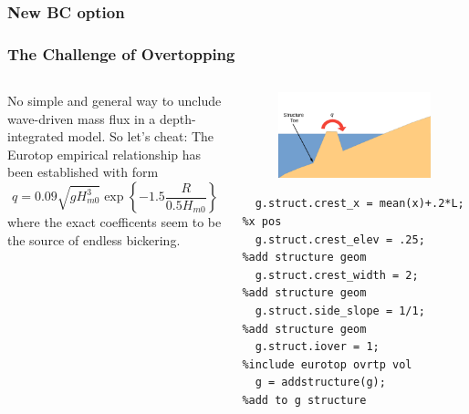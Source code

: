 \documentclass[aspectratio=169]{beamer}
\begin{document}
\begin{frame}
  \frametitle{New BC option}
\end{frame}
\begin{frame}[fragile]
  \frametitle{The Challenge of Overtopping}

 \begin{columns}[c] %
\begin{column}{0.5\textwidth}
   No simple and general
   way to unclude wave-driven mass flux in a depth-integrated model.
   So let's cheat: The Eurotop empirical relationship has been
   established with form
   \begin{equation*}
q = 0.09 \sqrt{g H_{m0}^3} \exp{\left\{-1.5\frac{R}{0.5 H_{m0}}\right\}}
   \end{equation*}
where the exact coefficents seem to be the source of endless bickering. 
\end{column}
\vrule{}
\begin{column}{0.5\textwidth}
\begin{figure}
  \includegraphics[width=.8\linewidth]{./overtopping_fig.pdf}
\end{figure}

{
\begin{verbatim}
  g.struct.crest_x = mean(x)+.2*L; %x pos 
  g.struct.crest_elev = .25;       %add structure geom 
  g.struct.crest_width = 2;        %add structure geom 
  g.struct.side_slope = 1/1;       %add structure geom 
  g.struct.iover = 1;              %include eurotop ovrtp vol
  g = addstructure(g);             %add to g structure 
\end{verbatim}%
}
\end{column}
 \end{columns}
 \end{frame}
\end{document}
